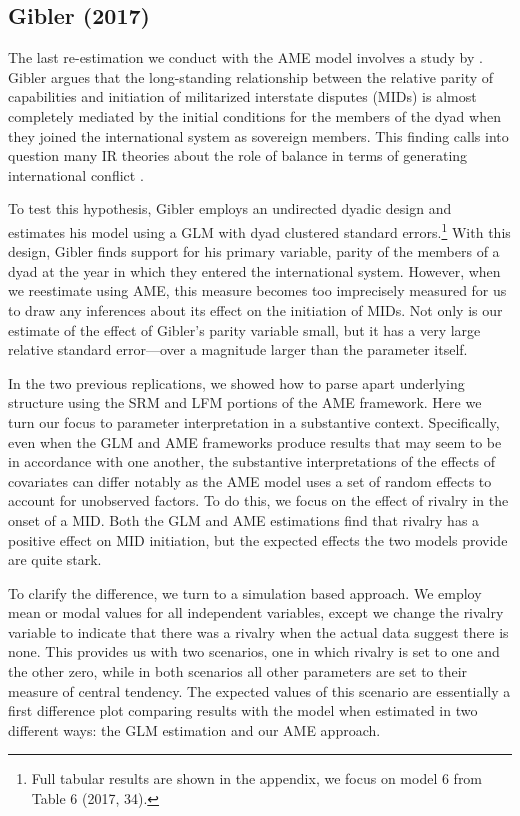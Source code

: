 \subsection{Gibler (2017)}

The last re-estimation we conduct with the AME model involves a study by \citet{gibler:2017}. Gibler argues that the long-standing relationship between the relative parity of capabilities and initiation of militarized interstate disputes (MIDs) is almost completely mediated by the initial conditions for the members of the dyad when they joined the international system as sovereign members. This finding calls into question many IR theories about the role of balance in terms of generating international conflict \citep{organski:1958}.

To test this hypothesis, Gibler employs an undirected dyadic design and estimates his model using a GLM with dyad clustered standard errors.\footnote{Full tabular results are shown in the appendix, we focus on model 6 from Table 6 (2017, 34).} With this design, Gibler finds support for his primary variable, parity of the members of a dyad at the year in which they entered the international system. However, when we reestimate using AME, this measure becomes too imprecisely measured for us to draw any inferences about its effect on the initiation of MIDs. Not only is our estimate of the effect of Gibler's parity variable small, but it has a very large relative standard error---over a magnitude larger than the parameter itself. 

In the two previous replications, we showed how to parse apart underlying structure using the SRM and LFM portions of the AME framework. Here we turn our focus to parameter interpretation in a substantive context. Specifically, even when the GLM and AME frameworks produce results that may seem to be in accordance with one another, the substantive interpretations of the effects of covariates can differ notably as the AME model uses a set of random effects to account for unobserved factors. To do this, we focus on the effect of rivalry in the onset of a MID. Both the GLM and AME estimations find that rivalry has a positive effect on MID initiation, but the expected effects the two models provide are quite stark.

To clarify the difference, we turn to a simulation based approach. We employ mean or modal values for all independent variables, except we change the rivalry variable to indicate that there was a rivalry when the actual data suggest there is none. This provides us with two scenarios, one in which rivalry is set to one and the other zero, while in both scenarios all other parameters are set to their measure of central tendency. The expected values of this scenario are essentially a first difference plot comparing results with the model when estimated in two different ways: the GLM estimation and our AME approach.  

